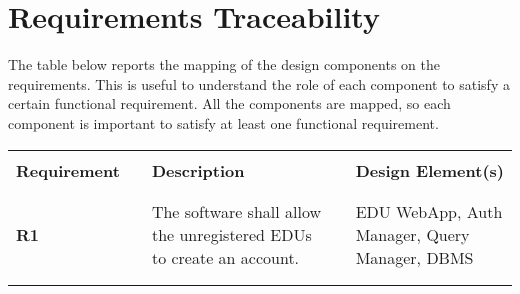 \chapter{Requirements Traceability}
The table below reports the mapping of the design components on the requirements. 
This is useful to understand the role of each component to satisfy a certain functional requirement. 
All the components are mapped, so each component is important to satisfy at least one functional requirement.

\renewcommand{\arraystretch}{0.5}
\begin{longtable}[H]{l l p{6cm} l p{4cm}}
    \hline
                            &        &                                                                                                                                                                                                                                                                              &        &                                                                                          \\
    \textbf{Requirement}    & \vline & \textbf{Description}                                                                                                                                                                                                                                                         & \vline & \textbf{Design Element(s)}                                                               \\
                            &        &                                                                                                                                                                                                                                                                              &        &                                                                                          \\\hline & & \\ 
    \textbf{R1}             & \vline & The software shall allow the unregistered EDUs to create an account.                                                                                                                                                                                                         & \vline &  EDU WebApp, Auth Manager, Query Manager, DBMS                                           \\
                            &        &                                                                                                                                                                                                                                                                              &        &                                                                                          \\\hline & & \\ 

\end{longtable}
